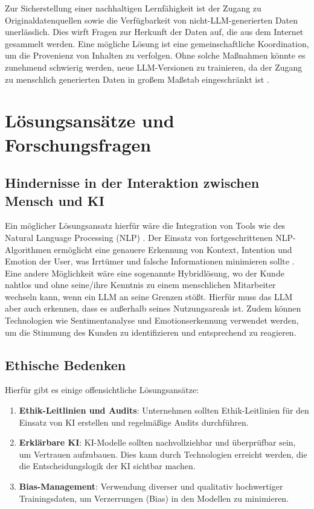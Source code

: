 \documentclass[12pt]{article}
\begin{document}
Zur Sicherstellung einer nachhaltigen Lernfähigkeit ist der Zugang zu Originaldatenquellen sowie die Verfügbarkeit von nicht-LLM-generierten Daten unerlässlich. Dies wirft Fragen zur Herkunft der Daten auf, die aus dem Internet gesammelt werden. Eine mögliche Lösung ist eine gemeinschaftliche Koordination, um die Provenienz von Inhalten zu verfolgen. Ohne solche Maßnahmen könnte es zunehmend schwierig werden, neue LLM-Versionen zu trainieren, da der Zugang zu menschlich generierten Daten in großem Maßstab eingeschränkt ist \cite{shumailov2023curse}.

\section{Lösungsansätze und Forschungsfragen}

\subsection{Hindernisse in der Interaktion zwischen Mensch und KI}

Ein möglicher Lösungsansatz hierfür wäre die Integration von Tools wie des Natural Language Processing (NLP) \cite{nlp}. Der Einsatz von fortgeschrittenen NLP-Algorithmen ermöglicht eine genauere Erkennung von Kontext, Intention und Emotion der User, was Irrtümer und falsche Informationen minimieren sollte \cite{wulf2024utilizinglargelanguagemodels}. Eine andere Möglichkeit wäre eine sogenannte Hybridlösung, wo der Kunde nahtlos und ohne seine/ihre Kenntnis zu einem menschlichen Mitarbeiter wechseln kann, wenn ein LLM an seine Grenzen stößt. Hierfür muss das LLM aber auch erkennen, dass es außerhalb seines Nutzungsareals ist. Zudem können Technologien wie Sentimentanalyse und Emotionserkennung verwendet werden, um die Stimmung des Kunden zu identifizieren und entsprechend zu reagieren.

\subsection{Ethische Bedenken}

Hierfür gibt es einige offensichtliche Lösungsansätze:

\begin{enumerate}
    \item \textbf{Ethik-Leitlinien und Audits}: Unternehmen sollten Ethik-Leitlinien für den Einsatz von KI erstellen und regelmäßige Audits durchführen.
    \item \textbf{Erklärbare KI}: KI-Modelle sollten nachvollziehbar und überprüfbar sein, um Vertrauen aufzubauen. Dies kann durch Technologien erreicht werden, die die Entscheidungslogik der KI sichtbar machen.
    \item \textbf{Bias-Management}: Verwendung diverser und qualitativ hochwertiger Trainingsdaten, um Verzerrungen (Bias) in den Modellen zu minimieren.
\end{enumerate}
\end{document}
